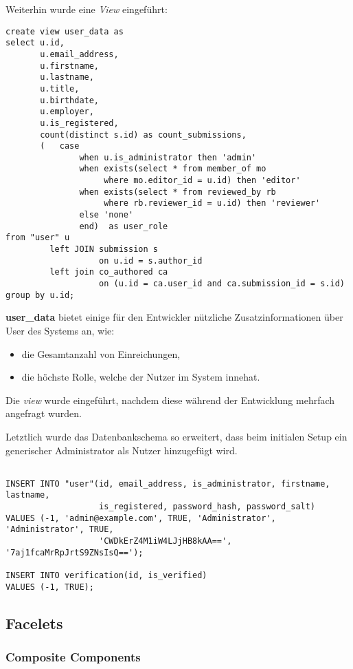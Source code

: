 \newline
Weiterhin wurde eine \emph{View} eingeführt:
\begin{verbatim}
create view user_data as
select u.id,
       u.email_address,
       u.firstname,
       u.lastname,
       u.title,
       u.birthdate,
       u.employer,
       u.is_registered,
       count(distinct s.id) as count_submissions,
       (   case
               when u.is_administrator then 'admin'
               when exists(select * from member_of mo
                    where mo.editor_id = u.id) then 'editor'
               when exists(select * from reviewed_by rb
                    where rb.reviewer_id = u.id) then 'reviewer'
               else 'none'
               end)  as user_role
from "user" u
         left JOIN submission s
                   on u.id = s.author_id
         left join co_authored ca
                   on (u.id = ca.user_id and ca.submission_id = s.id)
group by u.id;
\end{verbatim}
\textbf{user\_data} bietet einige für den Entwickler nützliche Zusatzinformationen
über User des Systems an, wie:
\begin{itemize}
    \item die Gesamtanzahl von Einreichungen,
    \item die höchste Rolle, welche der Nutzer im System innehat.
\end{itemize}
Die \emph{view} wurde eingeführt, nachdem diese während der Entwicklung mehrfach angefragt wurden.

\newline
Letztlich wurde das Datenbankschema so erweitert, dass beim initialen Setup ein
generischer Administrator als Nutzer hinzugefügt wird.
\begin{verbatim}

INSERT INTO "user"(id, email_address, is_administrator, firstname, lastname,
                   is_registered, password_hash, password_salt)
VALUES (-1, 'admin@example.com', TRUE, 'Administrator', 'Administrator', TRUE,
                   'CWDkErZ4M1iW4LJjHB8kAA==', '7aj1fcaMrRpJrtS9ZNsIsQ==');

INSERT INTO verification(id, is_verified)
VALUES (-1, TRUE);
\end{verbatim}

\subsection{Facelets}

\subsubsection{Composite Components}

